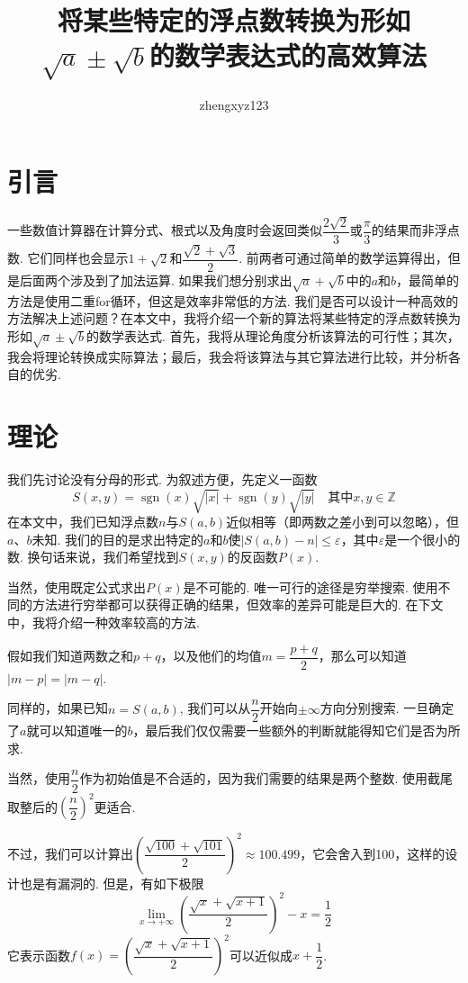 \documentclass[a4paper, UTF8]{ctexart}
\title{将某些特定的浮点数转换为形如$\sqrt{a}\pm\sqrt{b}$的数学表达式的高效算法}
\author{zhengxyz123}
\DeclareMathOperator{\sgn}{\mathrm{sgn}}
\begin{document}
\maketitle

\section{引言}
一些数值计算器在计算分式、根式以及角度时会返回类似$\dfrac{2\sqrt{2}}{3}$或$\dfrac{\pi}{3}$的结果而非浮点数. 它们同样也会显示$1+\sqrt{2}$和$\dfrac{\sqrt{2}+\sqrt{3}}{2}$. 前两者可通过简单的数学运算得出，但是后面两个涉及到了加法运算. 如果我们想分别求出$\sqrt{a}+\sqrt{b}$中的$a$和$b$，最简单的方法是使用二重for循环，但这是效率非常低的方法. 我们是否可以设计一种高效的方法解决上述问题？在本文中，我将介绍一个新的算法将某些特定的浮点数转换为形如$\sqrt{a}\pm\sqrt{b}$的数学表达式. 首先，我将从理论角度分析该算法的可行性；其次，我会将理论转换成实际算法；最后，我会将该算法与其它算法进行比较，并分析各自的优劣.

\section{理论}
我们先讨论没有分母的形式. 为叙述方便，先定义一函数\[S(x,y)=\sgn(x)\sqrt{|x|}+\sgn(y)\sqrt{|y|} \quad\mbox{其中}x,y\in\mathbb{Z}\]在本文中，我们已知浮点数$n$与$S(a,b)$近似相等（即两数之差小到可以忽略），但$a$、$b$未知. 我们的目的是求出特定的$a$和$b$使$|S(a,b)-n|\leq\varepsilon$，其中$\varepsilon$是一个很小的数. 换句话来说，我们希望找到$S(x,y)$的反函数$P(x)$.

当然，使用既定公式求出$P(x)$是不可能的. 唯一可行的途径是穷举搜索. 使用不同的方法进行穷举都可以获得正确的结果，但效率的差异可能是巨大的. 在下文中，我将介绍一种效率较高的方法.

假如我们知道两数之和$p+q$，以及他们的均值$m=\dfrac{p+q}{2}$，那么可以知道$|m-p|=|m-q|$.

同样的，如果已知$n=S(a,b)$, 我们可以从$\dfrac{n}{2}$开始向$\pm\infty$方向分别搜索. 一旦确定了$a$就可以知道唯一的$b$，最后我们仅仅需要一些额外的判断就能得知它们是否为所求.

当然，使用$\dfrac{n}{2}$作为初始值是不合适的，因为我们需要的结果是两个整数. 使用截尾取整后的$\left(\dfrac{n}{2}\right)^2$更适合.

不过，我们可以计算出$\left(\dfrac{\sqrt{100}+\sqrt{101}}{2}\right)^2\approx100.499$，它会舍入到100，这样的设计也是有漏洞的. 但是，有如下极限\[\lim_{x\to+\infty}\left(\frac{\sqrt{x}+\sqrt{x+1}}{2}\right)^2-x=\frac{1}{2}\]它表示函数$f(x)=\left(\dfrac{\sqrt{x}+\sqrt{x+1}}{2}\right)^2$可以近似成$x+\dfrac{1}{2}$.
\end{document}
